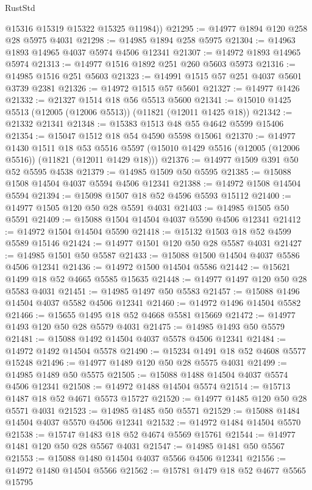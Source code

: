 \begin{lexlean}{RustStd}
\begin{coremodule}
        @15316
        @15319
        @15322
        @15325
        @11984))
@21295 := @14977 @1894 @120 @258 @28 @5975 @4031
@21298 := @14985 @1894 @258 @5975
@21304 := @14963 @1893 @14965 @4037 @5974 @4506 @12341
@21307 := @14972 @1893 @14965 @5974
@21313 := @14977 @1516 @1892 @251 @260 @5603 @5973
@21316 := @14985 @1516 @251 @5603
@21323 := @14991 @1515 @57 @251 @4037 @5601 @3739 @2381
@21326 := @14972 @1515 @57 @5601
@21327 := @14977 @1426
@21332 := @21327 @1514 @18 @56 @5513 @5600
@21341 := @15010 @1425 @5513 (@12005 (@12006 @5513)) (@11821 (@12011 @1425 @18))
@21342 := @21332 @21341
@21348 := @15383 @1513 @48 @55 @4642 @5599 @15406
@21354 := @15047 @1512 @18 @54 @4590 @5598 @15061
@21370 := @14977
    @1430
    @1511
    @18
    @53
    @5516
    @5597
    (@15010 @1429 @5516 (@12005 (@12006 @5516)) (@11821 (@12011 @1429 @18)))
@21376 := @14977 @1509 @391 @50 @52 @5595 @4538
@21379 := @14985 @1509 @50 @5595
@21385 := @15088 @1508 @14504 @4037 @5594 @4506 @12341
@21388 := @14972 @1508 @14504 @5594
@21394 := @15098 @1507 @18 @52 @4596 @5593 @15112
@21400 := @14977 @1505 @120 @50 @28 @5591 @4031
@21403 := @14985 @1505 @50 @5591
@21409 := @15088 @1504 @14504 @4037 @5590 @4506 @12341
@21412 := @14972 @1504 @14504 @5590
@21418 := @15132 @1503 @18 @52 @4599 @5589 @15146
@21424 := @14977 @1501 @120 @50 @28 @5587 @4031
@21427 := @14985 @1501 @50 @5587
@21433 := @15088 @1500 @14504 @4037 @5586 @4506 @12341
@21436 := @14972 @1500 @14504 @5586
@21442 := @15621 @1499 @18 @52 @4665 @5585 @15635
@21448 := @14977 @1497 @120 @50 @28 @5583 @4031
@21451 := @14985 @1497 @50 @5583
@21457 := @15088 @1496 @14504 @4037 @5582 @4506 @12341
@21460 := @14972 @1496 @14504 @5582
@21466 := @15655 @1495 @18 @52 @4668 @5581 @15669
@21472 := @14977 @1493 @120 @50 @28 @5579 @4031
@21475 := @14985 @1493 @50 @5579
@21481 := @15088 @1492 @14504 @4037 @5578 @4506 @12341
@21484 := @14972 @1492 @14504 @5578
@21490 := @15234 @1491 @18 @52 @4608 @5577 @15248
@21496 := @14977 @1489 @120 @50 @28 @5575 @4031
@21499 := @14985 @1489 @50 @5575
@21505 := @15088 @1488 @14504 @4037 @5574 @4506 @12341
@21508 := @14972 @1488 @14504 @5574
@21514 := @15713 @1487 @18 @52 @4671 @5573 @15727
@21520 := @14977 @1485 @120 @50 @28 @5571 @4031
@21523 := @14985 @1485 @50 @5571
@21529 := @15088 @1484 @14504 @4037 @5570 @4506 @12341
@21532 := @14972 @1484 @14504 @5570
@21538 := @15747 @1483 @18 @52 @4674 @5569 @15761
@21544 := @14977 @1481 @120 @50 @28 @5567 @4031
@21547 := @14985 @1481 @50 @5567
@21553 := @15088 @1480 @14504 @4037 @5566 @4506 @12341
@21556 := @14972 @1480 @14504 @5566
@21562 := @15781 @1479 @18 @52 @4677 @5565 @15795

\end{coremodule}
\end{lexlean}
